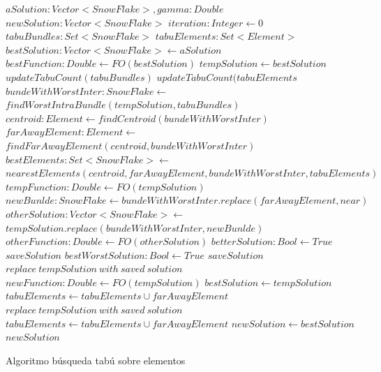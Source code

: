 \begin{algorithm}[H]
\begin{algorithmic}[1]
\REQUIRE $aSolution: Vector<SnowFlake>, gamma: Double$
\ENSURE $newSolution:Vector<SnowFlake>$
\STATE $iteration:Integer \leftarrow 0$
\STATE $tabuBundles: Set<SnowFlake>$
\STATE $tabuElements: Set<Element>$
\STATE $bestSolution: Vector<SnowFlake> \leftarrow aSolution$
\STATE $bestFunction:Double \leftarrow FO(bestSolution)$
\STATE $tempSolution \leftarrow bestSolution$
  \STATE $updateTabuCount(tabuBundles)$
  \STATE $updateTabuCount(tabuElements$
  \STATE $bundeWithWorstInter: SnowFlake \leftarrow$\\
  $findWorstIntraBundle(tempSolution, tabuBundles)$
  \STATE $centroid: Element \leftarrow findCentroid(bundeWithWorstInter)$
  \STATE $farAwayElement: Element \leftarrow$\\
  $findFarAwayElement(centroid, bundeWithWorstInter)$
  \STATE $bestElements: Set<SnowFlake> \leftarrow$\\
  $nearestElements(centroid, farAwayElement, bundeWithWorstInter, tabuElements)$
  \STATE $tempFunction: Double \leftarrow FO(tempSolution)$
    \STATE $newBunlde: SnowFlake \leftarrow bundeWithWorstInter.replace(farAwayElement, near)$
    \STATE $otherSolution: Vector<SnowFlake> \leftarrow$\\
    $tempSolution.replace(bundeWithWorstInter, newBunlde)$
    \STATE $otherFunction: Double \leftarrow FO(otherSolution)$
      \STATE $betterSolution: Bool \leftarrow True$
      \STATE $saveSolution$
    \ELSE
	\STATE $bestWorstSolution: Bool \leftarrow True$
	\STATE $saveSolution$
      \ENDIF
    \ENDIF
  \ENDFOR
    \STATE $replace\ tempSolution\ with\ saved\ solution$
    \STATE $newFunction: Double \leftarrow FO(tempSolution)$
      \STATE $bestSolution \leftarrow tempSolution$
    \ENDIF
    \STATE $tabuElements \leftarrow tabuElements \cup {farAwayElement}$
  \ELSE
      \STATE $replace\ tempSolution\ with\ saved\ solution$
      \STATE $tabuElements \leftarrow tabuElements \cup {farAwayElement}$
    \ENDIF
  \ENDIF
\ENDWHILE
\STATE $newSolution \leftarrow bestSolution$
\RETURN $newSolution$
\end{algorithmic}
\caption{Algoritmo búsqueda tabú sobre elementos}\label{alg:algBusTabuIntra}
\end{algorithm}
